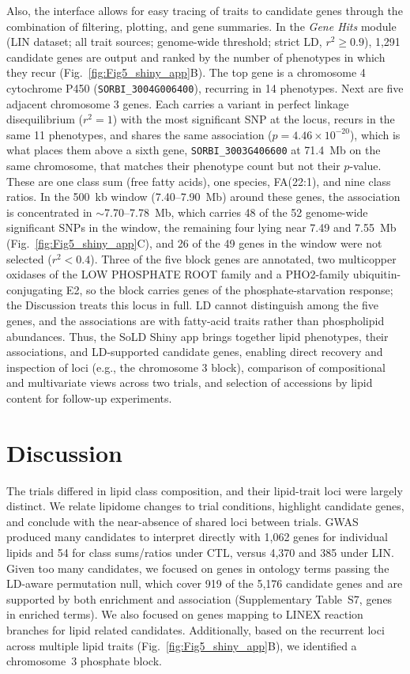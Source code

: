 \documentclass[9pt,twocolumn,twoside]{rilabRxiv}
\begin{document}
Also, the interface allows for easy tracing of traits to candidate genes through the combination of filtering, plotting, and gene summaries. In the \emph{Gene Hits} module (LIN dataset; all trait sources; genome-wide threshold; strict LD, $r^2 \geq 0.9$), 1,291 candidate genes are output and ranked by the number of phenotypes in which they recur (Fig.~\ref{fig:Fig5_shiny_app}B). The top gene is a chromosome 4 cytochrome P450 (\texttt{SORBI\_3004G006400}), recurring in 14 phenotypes. Next are five adjacent chromosome 3 genes. Each carries a variant in perfect linkage disequilibrium ($r^2 = 1$) with the most significant SNP at the locus, recurs in the same 11 phenotypes, and shares the same association ($p = 4.46 \times 10^{-20}$), which is what places them above a sixth gene, \texttt{SORBI\_3003G406600} at 71.4~Mb on the same chromosome, that matches their phenotype count but not their $p$-value. These are one class sum (free fatty acids), one species, FA(22:1), and nine class ratios. In the 500~kb window (7.40--7.90~Mb) around these genes, the association is concentrated in $\sim$7.70--7.78~Mb, which carries 48 of the 52 genome-wide significant SNPs in the window, the remaining four lying near 7.49 and 7.55~Mb (Fig.~\ref{fig:Fig5_shiny_app}C), and 26 of the 49 genes in the window were not selected ($r^2 < 0.4$). Three of the five block genes are annotated, two multicopper oxidases of the LOW PHOSPHATE ROOT family and a PHO2-family ubiquitin-conjugating E2, so the block carries genes of the phosphate-starvation response; the Discussion treats this locus in full. LD cannot distinguish among the five genes, and the associations are with fatty-acid traits rather than phospholipid abundances. Thus, the SoLD Shiny app brings together lipid phenotypes, their associations, and LD-supported candidate genes, enabling direct recovery and inspection of loci (e.g., the chromosome 3 block), comparison of compositional and multivariate views across two trials, and selection of accessions by lipid content for follow-up experiments.

\section{Discussion}

The trials differed in lipid class composition, and their lipid-trait loci were largely distinct. We relate lipidome changes to trial conditions, highlight candidate genes, and conclude with the near-absence of shared loci between trials. GWAS produced many candidates to interpret directly with 1,062 genes for individual lipids and 54 for class sums/ratios under CTL, versus 4,370 and 385 under LIN. Given too many candidates, we focused on genes in ontology terms passing the LD-aware permutation null, which cover 919 of the 5,176 candidate genes and are supported by both enrichment and association (Supplementary Table~S7, genes in enriched terms). We also focused on genes mapping to LINEX reaction branches for lipid related candidates. Additionally, based on the recurrent loci across multiple lipid traits (Fig.~\ref{fig:Fig5_shiny_app}B), we identified a chromosome~3 phosphate block.
\end{document}
